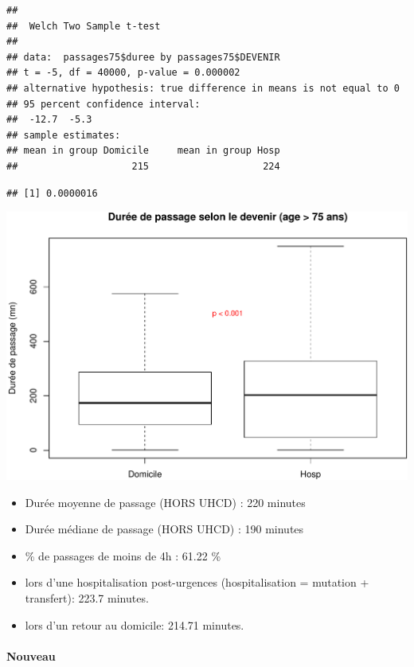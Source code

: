 \documentclass[]{article}
\begin{document}
\begin{verbatim}
## 
##  Welch Two Sample t-test
## 
## data:  passages75$duree by passages75$DEVENIR
## t = -5, df = 40000, p-value = 0.000002
## alternative hypothesis: true difference in means is not equal to 0
## 95 percent confidence interval:
##  -12.7  -5.3
## sample estimates:
## mean in group Domicile     mean in group Hosp 
##                    215                    224
\end{verbatim}

\begin{verbatim}
## [1] 0.0000016
\end{verbatim}

\includegraphics{rapport2014_V4_files/figure-latex/duree_passage_75-1.pdf}

\begin{itemize}
\itemsep1pt\parskip0pt
\item
  Durée moyenne de passage (HORS UHCD) : 220 minutes
\item
  Durée médiane de passage (HORS UHCD) : 190 minutes
\item
  \% de passages de moins de 4h : 61.22 \%
\item
  lors d'une hospitalisation post-urgences (hospitalisation = mutation +
  transfert): 223.7 minutes.
\item
  lors d'un retour au domicile: 214.71 minutes.
\end{itemize}

\paragraph{Nouveau}\label{nouveau}
\end{document}
